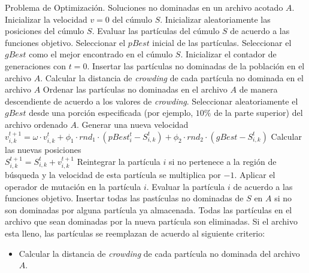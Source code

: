\begin{itemize}
\begin{algorithm}
      \begin{algorithmic}[1]			
	    \REQUIRE Problema de Optimizaci\'on.
	\ENSURE Soluciones no dominadas en un archivo acotado $A$.	  	  
	  \STATE Inicializar la velocidad $v=0$ del c\'umulo $S$.
	  \STATE Inicializar aleatoriamente las posiciones del c\'umulo $S$.
	  \STATE Evaluar las part\'iculas del c\'umulo $S$ de acuerdo a las funciones objetivo.
	  \STATE Seleccionar el $pBest$ inicial de las part\'iculas.
	  \STATE Seleccionar el $gBest$ como el mejor encontrado en el c\'umulo $S$.
	  \STATE Inicializar el contador de generaciones con $t=0$.
	  \STATE Insertar las part\'iculas no dominadas de la poblaci\'on en el archivo $A$.	  
	  \STATE Calcular la distancia de \textit{crowding} de cada part\'icula no dominada en el archivo $A$
	  \STATE Ordenar las part\'iculas no dominadas en el archivo $A$ de manera descendiente de acuerdo a los valores 
	     de \textit{crowding}.	   
	      \STATE Seleccionar aleatoriamente el $gBest$ desde una porci\'on especificada (por ejemplo, $10\%$ de la parte superior) 
	      del archivo ordenado $A$.
	     \STATE Generar una nueva velocidad 
		\\  $v^{t+1}_{i,k} = \omega \cdot v^t_{i,k} + \phi_1 \cdot rnd_1 \cdot \left(pBest^t_i - S^t_{i,k} \right) 
					    + \phi_2 \cdot rnd_2 \cdot \left(gBest - S^t_{i,k} \right)$	
	      \STATE Calcular las nuevas posiciones 
		\\$S^{t+1}_{i,k}=S^{t}_{i,k}+v^{t+1}_{i,k}$
	      \STATE Reintegrar la part\'icula $i$ si no pertenece a la regi\'on de b\'usqueda y la velocidad de esta part\'icula se 
	      multiplica por $-1$.	      
		\STATE Aplicar el operador de mutaci\'on en la part\'icula $i$.
	      \ENDIF
	      \STATE Evaluar la part\'icula $i$ de acuerdo a las funciones objetivo.
	     \ENDFOR					  
	  \STATE Insertar todas las past\'iculas no dominadas de $S$ en $A$ si no son dominadas por alguna part\'icula ya almacenada.
	  Todas las part\'iculas en el archivo que sean dominadas por la nueva part\'icula son eliminadas. Si el archivo esta lleno,
	  las part\'iculas se reemplazan de acuerdo al siguiente criterio:
	    \begin{itemize}
	       \item Calcular la distancia de \textit{crowding} de cada part\'icula no dominada del archivo $A$.

\end{itemize}
\end{algorithmic}
\end{algorithm}
\end{itemize}
